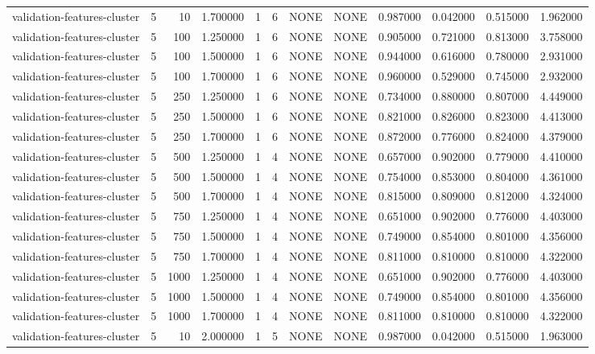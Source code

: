 \begin{tabular}{lrrrllllrrrr}
validation-features-cluster & 5 & 10 & 1.700000 & 1 & 6 & NONE & NONE & 0.987000 & 0.042000 & 0.515000 & 1.962000 \\
validation-features-cluster & 5 & 100 & 1.250000 & 1 & 6 & NONE & NONE & 0.905000 & 0.721000 & 0.813000 & 3.758000 \\
validation-features-cluster & 5 & 100 & 1.500000 & 1 & 6 & NONE & NONE & 0.944000 & 0.616000 & 0.780000 & 2.931000 \\
validation-features-cluster & 5 & 100 & 1.700000 & 1 & 6 & NONE & NONE & 0.960000 & 0.529000 & 0.745000 & 2.932000 \\
validation-features-cluster & 5 & 250 & 1.250000 & 1 & 6 & NONE & NONE & 0.734000 & 0.880000 & 0.807000 & 4.449000 \\
validation-features-cluster & 5 & 250 & 1.500000 & 1 & 6 & NONE & NONE & 0.821000 & 0.826000 & 0.823000 & 4.413000 \\
validation-features-cluster & 5 & 250 & 1.700000 & 1 & 6 & NONE & NONE & 0.872000 & 0.776000 & 0.824000 & 4.379000 \\
validation-features-cluster & 5 & 500 & 1.250000 & 1 & 4 & NONE & NONE & 0.657000 & 0.902000 & 0.779000 & 4.410000 \\
validation-features-cluster & 5 & 500 & 1.500000 & 1 & 4 & NONE & NONE & 0.754000 & 0.853000 & 0.804000 & 4.361000 \\
validation-features-cluster & 5 & 500 & 1.700000 & 1 & 4 & NONE & NONE & 0.815000 & 0.809000 & 0.812000 & 4.324000 \\
validation-features-cluster & 5 & 750 & 1.250000 & 1 & 4 & NONE & NONE & 0.651000 & 0.902000 & 0.776000 & 4.403000 \\
validation-features-cluster & 5 & 750 & 1.500000 & 1 & 4 & NONE & NONE & 0.749000 & 0.854000 & 0.801000 & 4.356000 \\
validation-features-cluster & 5 & 750 & 1.700000 & 1 & 4 & NONE & NONE & 0.811000 & 0.810000 & 0.810000 & 4.322000 \\
validation-features-cluster & 5 & 1000 & 1.250000 & 1 & 4 & NONE & NONE & 0.651000 & 0.902000 & 0.776000 & 4.403000 \\
validation-features-cluster & 5 & 1000 & 1.500000 & 1 & 4 & NONE & NONE & 0.749000 & 0.854000 & 0.801000 & 4.356000 \\
validation-features-cluster & 5 & 1000 & 1.700000 & 1 & 4 & NONE & NONE & 0.811000 & 0.810000 & 0.810000 & 4.322000 \\
validation-features-cluster & 5 & 10 & 2.000000 & 1 & 5 & NONE & NONE & 0.987000 & 0.042000 & 0.515000 & 1.963000 \\

\end{tabular}
